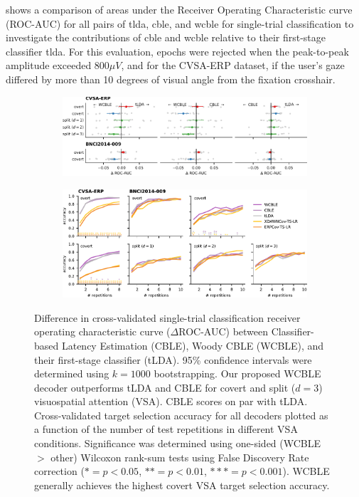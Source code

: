  shows a comparison of areas under the
Receiver Operating Characteristic curve (ROC-AUC) for all pairs of \ac{tlda}, \ac{cble},
and \ac{wcble} for single-trial classification to investigate the contributions of
\ac{cble} and \ac{wcble} relative to their first-stage classifier \ac{tlda}.
For this evaluation, epochs were rejected when the peak-to-peak amplitude
exceeded 800$\mu V$, and for the CVSA-ERP dataset, if the user's gaze differed by more than
10 degrees of visual angle from the fixation crosshair.
\begin{figure}
  \bigskip
	\begin{subfigure}{\linewidth}
		\caption{}
		\label{fig:single_trial_roc_auc_diff}
		\includegraphics[width=\linewidth]{figures/covert_align/figure4a.pdf}
	\end{subfigure}

	\bigskip

	\begin{subfigure}{\linewidth}
		\caption{}
		\label{fig:block_evaluation}
		\includegraphics[width=\linewidth]{figures/covert_align/figure4b.pdf}
	\end{subfigure}
  \caption[Decoder performance.]{%
		 Difference in cross-validated
    single-trial classification receiver operating characteristic curve ($\Delta$ROC-AUC)
    between Classifier-based Latency Estimation (CBLE), Woody
    CBLE (WCBLE),	and their first-stage classifier (tLDA).
    95\% confidence intervals were determined using $k=1000$ bootstrapping.
    Our proposed WCBLE decoder outperforms tLDA and CBLE for covert and split
		($d=3$)	visuospatial attention (VSA). CBLE scores on par with tLDA.
		 Cross-validated target selection accuracy for
    all decoders plotted as a function of the number of test repetitions in
    different VSA conditions. Significance was determined using one-sided
    (WCBLE $>$ other) Wilcoxon rank-sum tests using False Discovery Rate correction
    ($*= p<0.05$, $**=p<0.01$, $***=p<0.001$). WCBLE generally achieves the highest
    covert VSA target selection accuracy.}
\end{figure}

